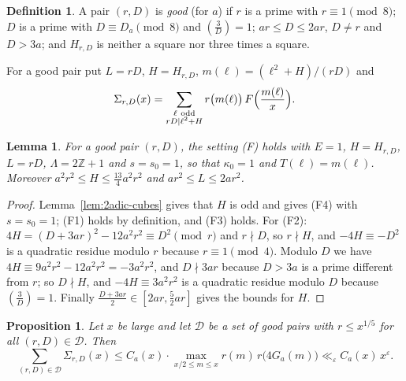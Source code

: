 \documentclass[11pt]{amsart}
\newtheorem{proposition}[theorem]{Proposition}
\newtheorem{lemma}[theorem]{Lemma}
\theoremstyle{remark}
\theoremstyle{definition}
\newtheorem{definition}[theorem]{Definition}
\numberwithin{equation}{section}
\newcommand{\Dc}{\mathcal{D}}
\newcommand{\Z}{\mathbb{Z}}
\newcommand{\eps}{\varepsilon}
\newcommand{\leg}[2]{\left(\frac{#1}{#2}\right)}
\begin{document}
\begin{definition}\label{def:goodcubes}
A pair $(r,D)$ is \emph{good} (for $a$) if $r$ is a prime with $r\equiv1\pmod8$; $D$ is a prime with $D\equiv D_a\pmod 8$ and $\leg3D=1$; $ar\le D\le2ar$, $D\ne r$ and $D>3a$; and $H_{r,D}$ is neither a square nor three times a square.
\end{definition}

For a good pair put $L=rD$, $H=H_{r,D}$, $m(\ell)=(\ell^2+H)/(rD)$ and
\[
\Sigma_{r,D}(x)=\sum_{\substack{\ell\ \mathrm{odd}\\ rD\mid\ell^2+H}}r\bigl(m(\ell)\bigr)\,F\Bigl(\frac{m(\ell)}x\Bigr).
\]

\begin{lemma}\label{lem:Fcubes}
For a good pair $(r,D)$, the setting \textup{(F)} holds with $E=1$, $H=H_{r,D}$, $L=rD$, $\Lambda=2\Z+1$ and $s=s_0=1$, so that $\kappa_0=1$ and $T(\ell)=m(\ell)$. Moreover $a^2r^2\le H\le\frac{13}4a^2r^2$ and $ar^2\le L\le2ar^2$.
\end{lemma}

\begin{proof}
Lemma~\ref{lem:2adic-cubes} gives that $H$ is odd and gives (F4) with $s=s_0=1$; (F1) holds by definition, and (F3) holds. For (F2): $4H=(D+3ar)^2-12a^2r^2\equiv D^2\pmod r$ and $r\nmid D$, so $r\nmid H$, and $-4H\equiv-D^2$ is a quadratic residue modulo $r$ because $r\equiv1\pmod4$. Modulo $D$ we have $4H\equiv9a^2r^2-12a^2r^2=-3a^2r^2$, and $D\nmid3ar$ because $D>3a$ is a prime different from $r$; so $D\nmid H$, and $-4H\equiv3a^2r^2$ is a quadratic residue modulo $D$ because $\leg3D=1$. Finally $\frac{D+3ar}2\in[2ar,\frac52ar]$ gives the bounds for $H$.
\end{proof}

\begin{proposition}\label{prop:reduction-cubes}
Let $x$ be large and let $\Dc$ be a set of good pairs with $r\le x^{1/5}$ for all $(r,D)\in\Dc$. Then
\[
\sum_{(r,D)\in\Dc}\Sigma_{r,D}(x)\le C_a(x)\cdot\max_{x/2\le m\le x}r(m)\,r\bigl(4G_a(m)\bigr)\ll_\eps C_a(x)\,x^{\eps}.
\]
\end{proposition}
\end{document}
